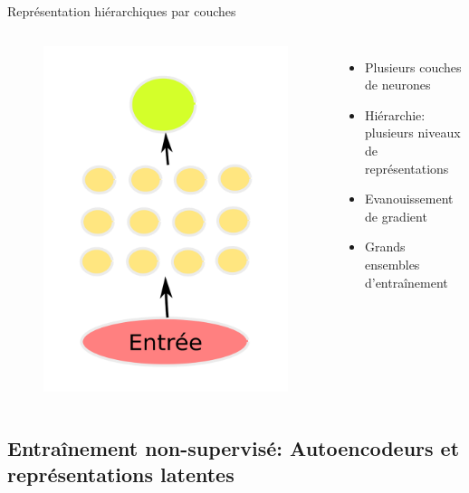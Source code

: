 \documentclass{beamer}
\begin{document}
\begin{frame}{Représentation hiérarchiques par couches}
\begin{columns}
{\begin{figure}
        \includegraphics[scale=0.1750]{../Figures/Deep}
      \end{figure}
    }

    \begin{itemize}
    \item Plusieurs couches de neurones
    \item Hiérarchie: plusieurs niveaux de représentations
    \item Evanouissement de gradient
    \item Grands ensembles d'entraînement
    \end{itemize}
  \end{columns}

\end{frame}

\subsection{Entraînement non-supervisé: Autoencodeurs et représentations latentes}
\end{document}
